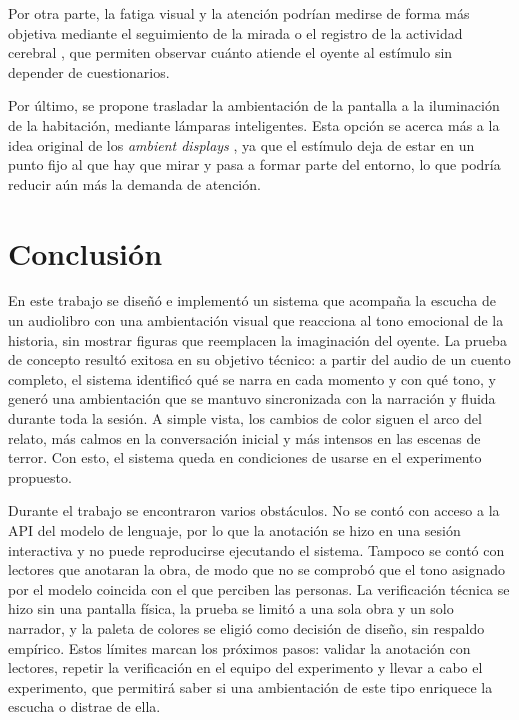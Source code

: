 \documentclass[journal]{IEEEtran}
\begin{document}
Por otra parte, la fatiga visual y la atención podrían medirse de forma más objetiva mediante el seguimiento de la mirada o el registro de la actividad cerebral \cite{mayer2024}, que permiten observar cuánto atiende el oyente al estímulo sin depender de cuestionarios.
 
Por último, se propone trasladar la ambientación de la pantalla a la iluminación de la habitación, mediante lámparas inteligentes. Esta opción se acerca más a la idea original de los \textit{ambient displays} \cite{wisneski1998}, ya que el estímulo deja de estar en un punto fijo al que hay que mirar y pasa a formar parte del entorno, lo que podría reducir aún más la demanda de atención.
 
\section{Conclusión}
En este trabajo se diseñó e implementó un sistema que acompaña la escucha de un audiolibro con una ambientación visual que reacciona al tono emocional de la historia, sin mostrar figuras que reemplacen la imaginación del oyente. La prueba de concepto resultó exitosa en su objetivo técnico: a partir del audio de un cuento completo, el sistema identificó qué se narra en cada momento y con qué tono, y generó una ambientación que se mantuvo sincronizada con la narración y fluida durante toda la sesión. A simple vista, los cambios de color siguen el arco del relato, más calmos en la conversación inicial y más intensos en las escenas de terror. Con esto, el sistema queda en condiciones de usarse en el experimento propuesto.

Durante el trabajo se encontraron varios obstáculos. No se contó con acceso a la API del modelo de lenguaje, por lo que la anotación se hizo en una sesión interactiva y no puede reproducirse ejecutando el sistema. Tampoco se contó con lectores que anotaran la obra, de modo que no se comprobó que el tono asignado por el modelo coincida con el que perciben las personas. La verificación técnica se hizo sin una pantalla física, la prueba se limitó a una sola obra y un solo narrador, y la paleta de colores se eligió como decisión de diseño, sin respaldo empírico. Estos límites marcan los próximos pasos: validar la anotación con lectores, repetir la verificación en el equipo del experimento y llevar a cabo el experimento, que permitirá saber si una ambientación de este tipo enriquece la escucha o distrae de ella.



 
\end{document}
